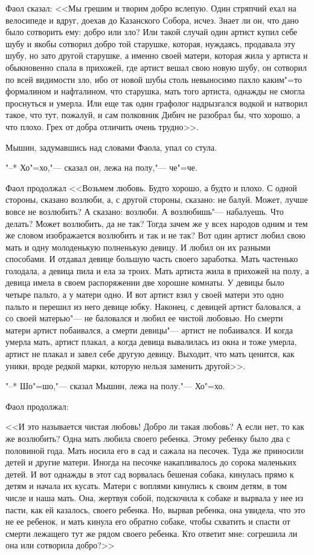 Фаол сказал: <<Мы грешим и творим добро 
вслепую. Один стряпчий ехал на велосипеде и 
вдруг, доехав до Казанского Собора, исчез. 
Знает ли он, что дано было сотворить ему:  
добро или зло? Или такой случай один артист 
купил себе шубу и якобы сотворил добро той 
старушке, которая, нуждаясь, продавала эту 
шубу, но зато другой старушке, а именно 
своей матери, которая жила у артиста и 
обыкновенно спала в прихожей, где артист 
вешал свою новую шубу, он сотворил по всей 
видимости зло, ибо от новой шубы столь 
невыносимо пахло каким"=то формалином и нафталином, 
что старушка, мать того артиста, однажды не 
смогла проснуться и умерла. Или еще так 
один графолог надрызгался водкой и натворил 
такое, что тут, пожалуй, и сам полковник 
Дибич не разобрал бы, что хорошо, а что плохо. 
Грех от добра отличить очень трудно>>.

Мышин, задумавшись над словами Фаола, упал со стула.

"--* Хо"=хо,"--- сказал он, лежа на полу,"--- 
че"=че.

Фаол продолжал <<Возьмем любовь. Будто 
хорошо, а будто и плохо. С одной стороны,
сказано возлюби, а, с другой стороны, 
сказано: не балуй. Может, лучше вовсе не 
возлюбить? А сказано: возлюби. А возлюбишь"--- 
набалуешь. Что делать?  Может возлюбить, да не
так?  Тогда зачем же у всех народов одним  и
тем же словом изображается возлюбить и так и
не так?  Вот  один  артист любил свою мать и
одну молоденькую полненькую девицу.  И любил
он их разными способами.  И  отдавал  девице
большую  часть своего заработка.  Мать  
частенько голодала, а девица пила и ела за 
троих. Мать артиста  жила в прихожей на полу, а
девица имела в своем  распоряжении две 
хорошие комнаты. У девицы было  четыре пальто, а
у матери одно. И вот артист взял у своей 
матери это одно пальто и перешил из него 
девице юбку. Наконец, с девицей артист  
баловался, а со своей матерью"--- не баловался  и
любил ее чистой любовью.  Но смерти матери 
артист побаивался, а смерти девицы"--- артист не
побаивался. И когда умерла мать, артист 
плакал, а когда девица вывалилась из окна и 
тоже умерла, артист не  плакал  и  завел  себе
другую девицу.  Выходит,  что  мать ценится,
как уники, вроде редкой марки, которую 
нельзя заменить другой>>.

"--* Шо"=шо,"--- сказал Мышин, лежа на полу."--- 
Хо"=хо.

Фаол продолжал: 
    
<<И это  называется чистая любовь!  Добро
ли такая  любовь?  А  если  нет,  то  как же
возлюбить? Одна мать любила  своего ребенка.
Этому ребенку  было  два  с  половиной года.
Мать  носила его в сад и сажала на  песочек.
Туда  же  приносили детей и  другие  матери.
Иногда на  песочке  накапливалось  до сорока
маленьких детей.  И  вот однажды в  этот сад
ворвалась  бешеная собака,  кинулась прямо к
детям и начала их кусать.  Матери с  воплями
кинулись к  своим детям,  в том числе и наша
мать. Она, жертвуя собой, подскочила к 
собаке и вырвала у нее из пасти,  как  ей  
казалось,  своего ребенка.  Но, вырвав  ребенка,
она увидела, что это не ее ребенок,  и  мать
кинула его обратно собаке, чтобы схватить  и
спасти  от  смерти  лежащего  тут  же  рядом
своего ребенка.  Кто ответит мне:  согрешила
ли она или сотворила добро?>>

